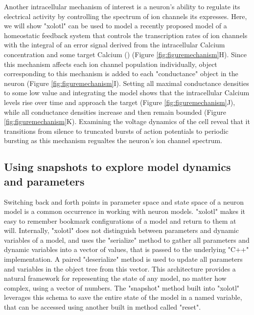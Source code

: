 \documentclass{frontiersSCNS} %
\begin{document}
Another intracellular mechanism of interest is a neuron's ability to regulate its electrical activity by controlling the spectrum of ion channels its expresses. Here, we will show "xolotl" can be used to model a recently proposed model of a homeostatic feedback system that controls the transcription rates of ion channels with the integral of an error signal derived from the intracellular Calcium concentration and some target Calcium (\cite{olearyCorrelationsIonChannel2013, olearyCellTypesNetwork2014}) (Figure \ref{fig:figuremechanism}H). Since this mechanism affects each ion channel population individually, object corresponding to this mechanism is added to each "conductance" object in the neuron (Figure \ref{fig:figuremechanism}I). Setting all maximal conductance densities to some low value and integrating the model shows that the intracellular Calcium levels rise over time and approach the target (Figure \ref{fig:figuremechanism}J), while all conductance densities increase and then remain bounded (Figure \ref{fig:figuremechanism}K). Examining the voltage dynamics of the cell reveal that it transitions from silence to truncated bursts of action potentials to periodic bursting as this mechanism regualtes the neuron's ion channel spectrum. 



%
%
%
%
%



\subsection{Using snapshots to explore model dynamics and parameters}

Switching back and forth points in parameter space and state space of a neuron model is a common occurrence in working with neuron models. "xolotl" makes it easy to remember bookmark configurations of a model and return to them at will. Internally, "xolotl" does not distinguish between parameters and dynamic variables of a model, and uses the "serialize" method to gather all parameters and dynamic variables into a vector of values, that is passed to the underlying "C++" implementation. A paired "deserialize" method is used to update all parameters and variables in the object tree from this vector. This architecture provides a natural framework for representing the state of any model, no matter how complex, using a vector of numbers. The "snapshot" method built into "xolotl" leverages this schema to save the entire state of the model in a named variable, that can be accessed using another built in method called "reset". 
\end{document}
